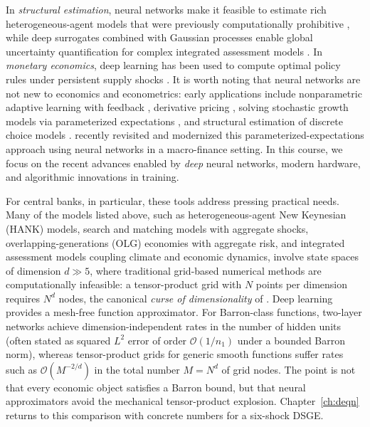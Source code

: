 \documentclass[11pt,a4paper]{report}
\begin{document}
%
In \emph{structural estimation}, neural networks make it feasible to estimate rich heterogeneous-agent models that were previously computationally prohibitive \citep{kase2022estimating}, while deep surrogates combined with Gaussian processes enable global uncertainty quantification for complex integrated assessment models \citep{friedlDeep2023}.
%
In \emph{monetary economics}, deep learning has been used to compute optimal policy rules under persistent supply shocks \citep{nuno2024monetary}.
%
It is worth noting that neural networks are not new to economics and econometrics: early applications include nonparametric adaptive learning with feedback \citep{chenwhite1998adaptive}, derivative pricing \citep{hutchinson1994nonparametric}, solving stochastic growth models via parameterized expectations \citep{duffy2001approximating}, and structural estimation of discrete choice models \citep{doi:10.1080/07474938.2011.607089}.  \citet{valaitisvilla2024} recently revisited and modernized this parameterized-expectations approach using neural networks in a macro-finance setting.  In this course, we focus on the recent advances enabled by \emph{deep} neural networks, modern hardware, and algorithmic innovations in training.

For central banks, in particular, these tools address pressing practical needs.  Many of the models listed above, such as heterogeneous-agent New Keynesian (HANK) models, search and matching models with aggregate shocks, overlapping-generations (OLG) economies with aggregate risk, and integrated assessment models coupling climate and economic dynamics, involve state spaces of dimension $d \gg 5$, where traditional grid-based numerical methods are computationally infeasible: a tensor-product grid with $N$ points per dimension requires $N^{d}$ nodes, the canonical \emph{curse of dimensionality} of \citet{bellman1961adaptive}.  Deep learning provides a mesh-free function approximator.  For Barron-class functions, two-layer networks achieve dimension-independent rates in the number of hidden units (often stated as squared $L^2$ error of order $\mathcal{O}(1/n_1)$ under a bounded Barron norm), whereas tensor-product grids for generic smooth functions suffer rates such as $\mathcal{O}(M^{-2/d})$ in the total number $M=N^d$ of grid nodes.  The point is not that every economic object satisfies a Barron bound, but that neural approximators avoid the mechanical tensor-product explosion.  Chapter~\ref{ch:deqn} returns to this comparison with concrete numbers for a six-shock DSGE.
\end{document}
